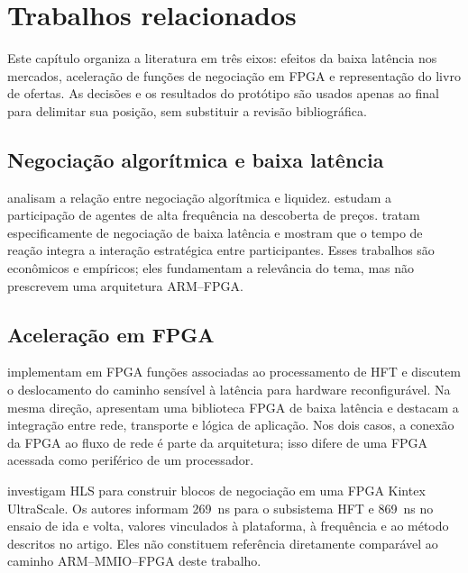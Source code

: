 \chapter{Trabalhos relacionados}
\label{cap:trabalhos:relacionados}

Este capítulo organiza a literatura em três eixos: efeitos da baixa latência nos mercados, aceleração de funções de negociação em FPGA e representação do livro de ofertas. As decisões e os resultados do protótipo são usados apenas ao final para delimitar sua posição, sem substituir a revisão bibliográfica.

\section{Negociação algorítmica e baixa latência}\label{sec:relacionadosHFT}

 analisam a relação entre negociação algorítmica e liquidez.  estudam a participação de agentes de alta frequência na descoberta de preços.  tratam especificamente de negociação de baixa latência e mostram que o tempo de reação integra a interação estratégica entre participantes. Esses trabalhos são econômicos e empíricos; eles fundamentam a relevância do tema, mas não prescrevem uma arquitetura ARM--FPGA.

\section{Aceleração em FPGA}\label{sec:relacionadosFPGA}

 implementam em FPGA funções associadas ao processamento de HFT e discutem o deslocamento do caminho sensível à latência para hardware reconfigurável. Na mesma direção,  apresentam uma biblioteca FPGA de baixa latência e destacam a integração entre rede, transporte e lógica de aplicação. Nos dois casos, a conexão da FPGA ao fluxo de rede é parte da arquitetura; isso difere de uma FPGA acessada como periférico de um processador.

 investigam HLS para construir blocos de negociação em uma FPGA Kintex UltraScale. Os autores informam 269~ns para o subsistema HFT e 869~ns no ensaio de ida e volta, valores vinculados à plataforma, à frequência e ao método descritos no artigo. Eles não constituem referência diretamente comparável ao caminho ARM--MMIO--FPGA deste trabalho.

